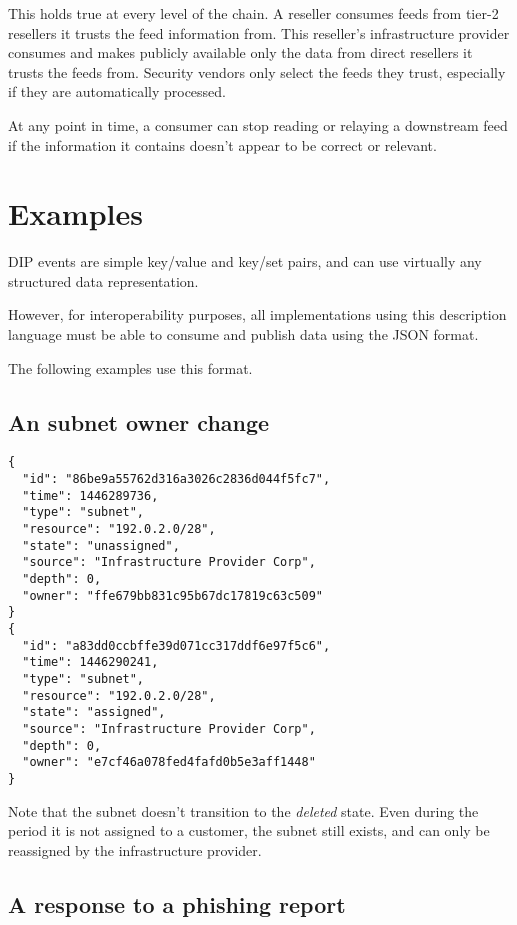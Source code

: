 \documentclass[conference]{IEEEtran}
\begin{document}
This holds true at every level of the chain. A reseller consumes feeds from tier-2 resellers it trusts the feed information from. This reseller's infrastructure provider consumes and makes publicly available only the data from direct resellers it trusts the feeds from. Security vendors only select the feeds they trust, especially if they are automatically processed.

At any point in time, a consumer can stop reading or relaying a downstream feed if the information it contains doesn't appear to be correct or relevant.

\section{Examples}

DIP events are simple key/value and key/set pairs, and can use virtually any structured data representation.

However, for interoperability purposes, all implementations using this description language must be able to consume and publish data using the JSON format.

The following examples use this format.

\subsection{An subnet owner change}

\begin{verbatim}
{
  "id": "86be9a55762d316a3026c2836d044f5fc7",
  "time": 1446289736,
  "type": "subnet",
  "resource": "192.0.2.0/28",
  "state": "unassigned",
  "source": "Infrastructure Provider Corp",
  "depth": 0,
  "owner": "ffe679bb831c95b67dc17819c63c509"  
}
{
  "id": "a83dd0ccbffe39d071cc317ddf6e97f5c6",
  "time": 1446290241,
  "type": "subnet",
  "resource": "192.0.2.0/28",
  "state": "assigned",
  "source": "Infrastructure Provider Corp",
  "depth": 0,
  "owner": "e7cf46a078fed4fafd0b5e3aff1448"  
}
\end{verbatim}

Note that the subnet doesn't transition to the \emph{deleted} state. Even during the period it is not assigned to a customer, the subnet still exists, and can only be reassigned by the infrastructure provider.

\subsection{A response to a phishing report}
\end{document}
